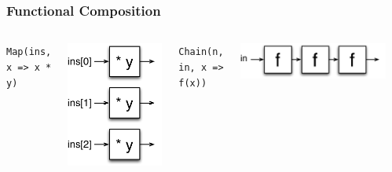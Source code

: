 \documentclass[xcolor=pdflatex,dvipsnames,table]{beamer}
\begin{document}
\begin{frame}
\frametitle{Functional Composition}


\begin{Large}
\begin{columns}

\verb+Map(ins, x => x * y)+ \\
\begin{center}
\includegraphics[height=0.6\textheight]{../bootcamp/figs/map.pdf} \\[2cm]
\end{center}

\vskip2mm
\verb+Chain(n, in, x => f(x))+ \\
\begin{center}
\includegraphics[width=0.9\textwidth]{../bootcamp/figs/chain.pdf} \\
\end{center}


\end{columns}
\end{Large}
\end{frame}
\end{document}
